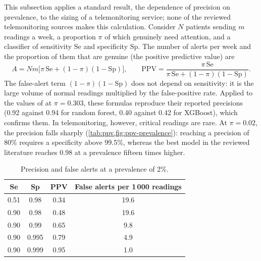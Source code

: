This subsection applies a standard result, the dependence of precision on prevalence, to the sizing of a telemonitoring service; none of the reviewed telemonitoring sources makes this calculation. Consider $N$ patients sending $m$ readings a week, a proportion $\pi$ of which genuinely need attention, and a classifier of sensitivity $\mathrm{Se}$ and specificity $\mathrm{Sp}$. The number of alerts per week and the proportion of them that are genuine (the positive predictive value) are
\begin{equation}
  A = N m \bigl[\pi\,\mathrm{Se} + (1-\pi)(1-\mathrm{Sp})\bigr],
  \qquad
  \mathrm{PPV} = \frac{\pi\,\mathrm{Se}}{\pi\,\mathrm{Se} + (1-\pi)(1-\mathrm{Sp})}.
\end{equation}
The false-alert term $(1-\pi)(1-\mathrm{Sp})$ does not depend on sensitivity: it is the large volume of normal readings multiplied by the false-positive rate. Applied to the values of \textcite{mendoza2025} at $\pi = 0.303$, these formulas reproduce their reported precisions (0.92 against 0.94 for random forest, 0.40 against 0.42 for XGBoost), which confirms them. In telemonitoring, however, critical readings are rare. At $\pi = 0.02$, the precision falls sharply (\cref{tab:ppv,fig:ppv-prevalence}): reaching a precision of 80\% requires a specificity above 99.5\%, whereas the best model in the reviewed literature reaches 0.98 at a prevalence fifteen times higher.

\begin{table}[htbp]
\centering\small
\caption{Precision and false alerts at a prevalence of 2\%.}\label{tab:ppv}
\begin{tabular}{@{}cccc@{}}
\toprule
\textbf{Se} & \textbf{Sp} & \textbf{PPV} & \textbf{False alerts per 1\,000 readings} \\
\midrule
0.51 & 0.98 & 0.34 & 19.6 \\
0.90 & 0.98 & 0.48 & 19.6 \\
0.90 & 0.99 & 0.65 & 9.8 \\
0.90 & 0.995 & 0.79 & 4.9 \\
0.90 & 0.999 & 0.95 & 1.0 \\
\bottomrule
\end{tabular}
\end{table}

